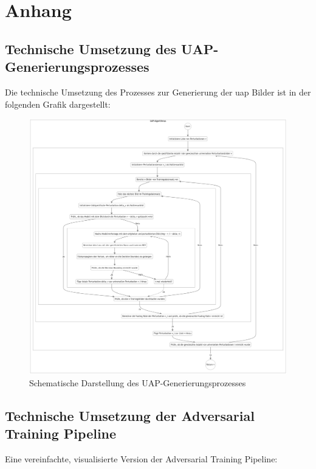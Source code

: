 \section*{Anhang}

\subsection*{Technische Umsetzung des UAP-Generierungsprozesses}

Die technische Umsetzung des Prozesses zur Generierung der \acrshort{uap} Bilder ist in der folgenden Grafik dargestellt:

\begin{figure}[H]
    \centering
    \includegraphics[width=\linewidth]{01-images/04-methodik/UAP_ALG.png}
    \caption{Schematische Darstellung des UAP-Generierungsprozesses}
    \label{fig:05-uap_algorithm}
\end{figure}

\newpage

\subsection*{Technische Umsetzung der Adversarial Training Pipeline}

Eine vereinfachte, visualisierte Version der Adversarial Training Pipeline:

